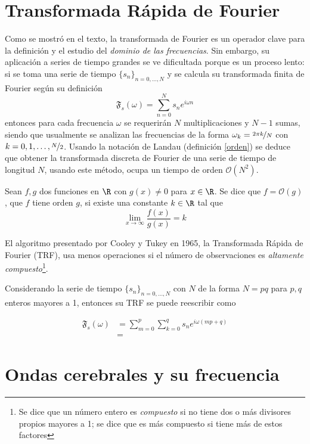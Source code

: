 \section{Transformada Rápida de Fourier}

Como se mostró en el texto, la transformada de Fourier es un operador clave para la definición y el
estudio del \textit{dominio de las frecuencias}. Sin embargo, su aplicación a series de tiempo grandes se ve
dificultada porque es un proceso lento: si se toma una serie de tiempo 
$\{s_n\}_{n=0,\dots,N}$ y se calcula su transformada finita de Fourier según su definición
\begin{equation*}
\mathfrak{F}_s(\omega) = \sum_{n=0}^{N} s_n e^{i \omega n}
\end{equation*}
entonces para cada frecuencia $\omega$ se requerirán $N$ multiplicaciones y $N-1$ sumas, siendo que
usualmente se analizan las frecuencias de la forma $\omega_k = \nicefrac{2 \pi k}{N}$ 
con $k = 0, 1, \dots, \nicefrac{N}{2}$.
Usando la notación de Landau (definición \ref{orden}) se deduce que obtener la transformada discreta
de Fourier de una serie de tiempo de longitud $N$, usando este método, 
ocupa un tiempo de orden $\mathcal{O}(N^{2})$.

\begin{definicion}
Sean $f, g$ dos funciones en $\R$ con $g(x)\neq 0$ para $x\in \R$. Se dice que $f = \mathcal{O}(g)$,
que $f$ tiene orden $g$, si existe una constante $k\in \R$ tal que
\begin{equation*}
\lim_{x\rightarrow \infty} \frac{f(x)}{g(x)} = k
\end{equation*}
\label{orden}
\end{definicion}

El algoritmo presentado por Cooley y Tukey en 1965, la Transformada Rápida de Fourier 
(TRF), usa menos operaciones si el número de observaciones es \textit{altamente 
compuesto}\footnote{Se dice que un número entero es \textit{compuesto} si no tiene dos o más
divisores propios mayores a 1; se dice que es más compuesto si tiene más de estos factores}.

Considerando la serie de tiempo $\{s_n\}_{n=0,\dots,N}$ con $N$ de la forma $N= p q$ para 
$p, q$ enteros mayores a 1, entonces su TRF se puede reescribir como

\begin{align*}
\mathfrak{F}_s(\omega) &= \sum_{m = 0}^{p} \sum_{k=0}^{q} s_n e^{i \omega (mp + q)} 
\\
&= 
\end{align*}

\section{Ondas cerebrales y su frecuencia}

